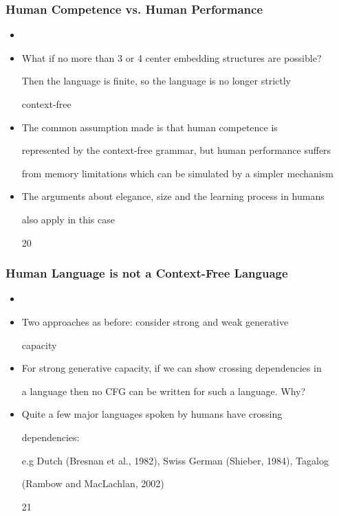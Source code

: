 \documentclass[compress,color=usenames]{beamer}
\begin{document}
\begin{frame}
\frametitle{Human Competence vs. Human Performance}

\begin{itemize}
\item




\item What if no more than 3 or 4 center embedding structures are possible?


Then the language is ﬁnite, so the language is no longer strictly


context-free





\item The common assumption made is that human competence is


represented by the context-free grammar, but human performance suffers


from memory limitations which can be simulated by a simpler mechanism





\item The arguments about elegance, size and the learning process in humans


also apply in this case


20




\end{itemize}

\end{frame}

\begin{frame}
\frametitle{Human Language is not a Context-Free Language}

\begin{itemize}
\item




\item Two approaches as before: consider strong and weak generative


capacity





\item For strong generative capacity, if we can show crossing dependencies in


a language then no CFG can be written for such a language. Why?





\item Quite a few major languages spoken by humans have crossing


dependencies:


e.g Dutch (Bresnan et al., 1982), Swiss German (Shieber, 1984), Tagalog


(Rambow and MacLachlan, 2002)


21




\end{itemize}

\end{frame}
\end{document}
